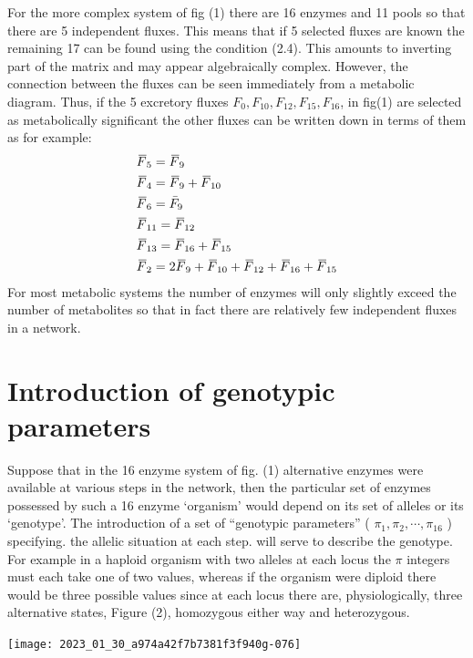 For the more complex system of fig (1) there are 16 enzymes and 11 pools so that there are 5 independent fluxes. This means that if 5 selected fluxes are known the remaining 17 can be found using the condition (2.4). This amounts to inverting part of the matrix and may appear algebraically complex. However, the connection between the fluxes can be seen immediately from a metabolic diagram. Thus, if the 5 excretory fluxes $F_{0}, F_{10}, F_{12}, F_{15}, F_{16}$, in fig(1) are selected as metabolically significant the other fluxes can be written down in terms of them as for example:
%
\begin{equation}
\begin{aligned}
& \olsi{F}_5=\olsi{F}_9 \\
& \olsi{F}_4=\olsi{F}_9 + \olsi{F}_{10} \\
& \olsi{F}_6=\bar{F}_9 \\
& \olsi{F}_{11}=\olsi{F}_{12} \\
& \olsi{F}_{13}=\olsi{F}_{16} + \olsi{F}_{15} \\
& \olsi{F}_2=2 \olsi{F}_9 + \olsi{F}_{10}+\olsi{F}_{12}+\olsi{F}_{16}+\olsi{F}_{15}
\end{aligned}
\label{eqn:25}
\end{equation}
%
For most metabolic systems the number of enzymes will only slightly exceed the number of metabolites so that in fact there are relatively few independent fluxes in a network.

\section{Introduction of genotypic parameters}

Suppose that in the 16 enzyme system of fig. (1) alternative enzymes were available at various steps in the network, then the particular set of enzymes possessed by such a 16 enzyme `organism' would depend on its set of alleles or its `genotype'. The introduction of a set of ``genotypic parameters'' ( $\pi_{1}, \pi_{2}, \cdots, \pi_{16}$ ) specifying. the allelic situation at each step. will serve to describe the genotype. For example in a haploid organism with two alleles at each locus the $\pi$ integers must each take one of two values, whereas if the organism were diploid there would be three possible values since at each locus there are, physiologically, three alternative states, Figure (2), homozygous either way and heterozygous.

\centerline{\texttt{[image: 2023\_01\_30\_a974a42f7b7381f3f940g-076]}}

